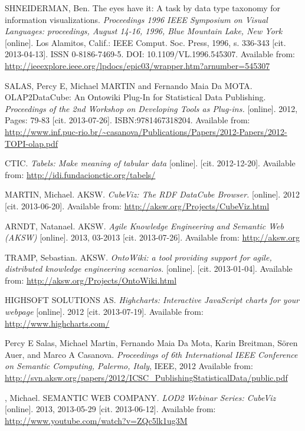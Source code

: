 \begin{thebibliography}{99}
 {\sc SHNEIDERMAN,} Ben.
 The eyes have it: A task by data type taxonomy for information visualizations.
 \emph{Proceedings 1996 IEEE Symposium on Visual Languages: proceedings,
 August 14-16, 1996, Blue Mountain Lake, New York}
 [online]. Los Alamitos, Calif.: IEEE Comput. Soc. Press, 1996, s. 336-343
 [cit. 2013-04-13]. ISSN 0-8186-7469-5. DOI: 10.1109/VL.1996.545307.
 Available from: \url{http://ieeexplore.ieee.org/lpdocs/epic03/wrapper.htm?arnumber=545307}

{\sc SALAS,} Percy E, Michael MARTIN and Fernando Maia Da MOTA.
OLAP2DataCube: An Ontowiki Plug-In for Statistical Data Publishing.
\emph{Proceedings of the 2nd Workshop on Developing Tools as Plug-ins.} 
[online]. 2012, Pages: 79-83 [cit. 2013-07-26]. ISBN:9781467318204.
Available from: \url{http://www.inf.puc-rio.br/~casanova/Publications/Papers/2012-Papers/2012-TOPI-olap.pdf}

{\sc CTIC.}
\emph{Tabels: Make meaning of tabular data} [online]. [cit. 2012-12-20].
Available from: \url{http://idi.fundacionctic.org/tabels/}

{\sc MARTIN,} Michael. AKSW.
\emph{CubeViz: The RDF DataCube Browser.} [online]. 2012 [cit. 2013-06-20].
Available from: \url{http://aksw.org/Projects/CubeViz.html}

{\sc ARNDT, Natanael.} AKSW. 
\emph{Agile Knowledge Engineering and Semantic Web (AKSW)} [online].
2013, 03-2013 [cit. 2013-07-26].
Available from: \url{http://aksw.org}

{\sc TRAMP,} Sebastian. AKSW.
\emph{OntoWiki: a tool providing support for agile, distributed knowledge engineering scenarios.}
[online]. [cit. 2013-01-04]. 
Available from: \url{http://aksw.org/Projects/OntoWiki.html}

{\sc HIGHSOFT SOLUTIONS AS.}
\emph{Highcharts: Interactive JavaScript charts for your webpage} [online]. 2012
[cit. 2013-07-19]. 
Available from: \url{http://www.highcharts.com/}

{\sc Percy} E Salas, Michael Martin, Fernando Maia Da Mota,
Karin Breitman, Sören Auer, and Marco A Casanova.
\emph{Proceedings of 6th International IEEE Conference on Semantic Computing, Palermo, Italy},
IEEE, 2012
Available from: \url{http://svn.aksw.org/papers/2012/ICSC_PublishingStatisticalData/public.pdf}

{\scMARTIN,} Michael. SEMANTIC WEB COMPANY.
\emph{LOD2 Webinar Series: CubeViz} [online]. 2013, 2013-05-29
[cit. 2013-06-12].
Available from: \url{http://www.youtube.com/watch?v=ZQc5lk1ug3M}


\end{thebibliography}
